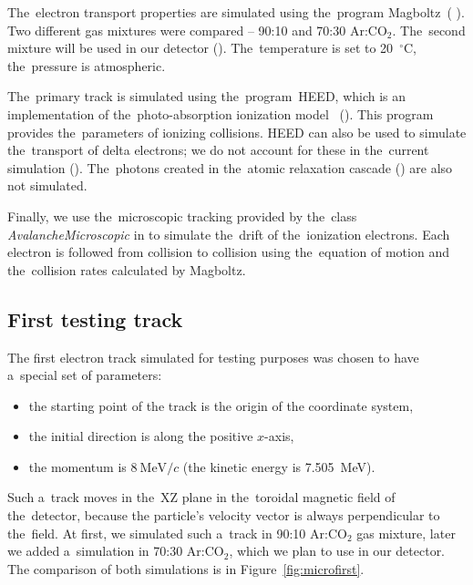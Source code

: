 		The~electron transport properties are simulated using the~program Magboltz~( ). Two different gas mixtures were compared -- 90:10 and 70:30 Ar:CO$_2$. The~second mixture will be used in our detector (). The~temperature is set to 20~$^\circ$C, the~pressure is atmospheric.
		
		The~primary track is simulated using the~program~\ac{HEED}, which is an implementation of the~photo-absorption ionization model~\cite{HEED} (). This program provides the~parameters of ionizing collisions. \ac{HEED} can also be used to simulate the~transport of delta electrons; we do not account for these in the~current simulation (). The~photons created in the~atomic relaxation cascade () are also not simulated.
		
		Finally, we use the~microscopic tracking provided by the~class \textit{AvalancheMicroscopic} in \garfieldpp to simulate the~drift of the~ionization electrons. Each electron is followed from collision to collision using the~equation of motion and the~collision rates calculated by Magboltz.
		
		
		\subsection{First testing track}
		\label{sec:microfirst}
			The first electron track simulated for testing purposes was chosen to have a~special set of parameters:
				\begin{itemize}[nosep]
					\item the starting point of the track is the origin of the coordinate system,
					\item the initial direction is along the positive $x$-axis,
					\item the momentum is $8~\text{MeV}/c$ (the kinetic energy is 7.505~MeV).
				\end{itemize}
			Such a~track moves in the~XZ plane in the~toroidal magnetic field of the~detector, because the particle's velocity vector is always perpendicular to the~field. At first, we simulated such a~track in 90:10 Ar:CO$_2$ gas mixture, later we added a~simulation in 70:30 Ar:CO$_2$, which we plan to use in our detector. The comparison of both simulations is in Figure~\ref{fig:microfirst}.
			
